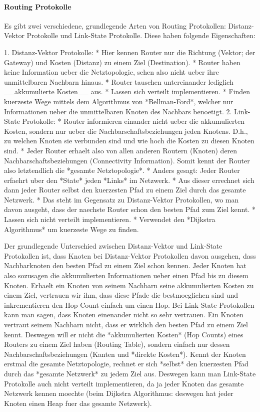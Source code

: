 \paragraph{Routing Protokolle} 

Es gibt zwei verschiedene, grundlegende Arten von Routing Protokollen:
Distanz-Vektor Protokolle und Link-State Protokolle. Diese haben folgende
Eigenschaften:

1. Distanz-Vektor Protokolle:
   * Hier kennen Router nur die Richtung (Vektor; der Gateway) und Kosten (Distanz)
     zu einem Ziel (Destination).
   * Router haben keine Information ueber die Netztopologie, sehen also nicht
     ueber ihre unmittelbaren Nachbarn hinaus.
   * Router tauschen untereinander lediglich \_\_akkumulierte Kosten\_\_ aus.
   * Lassen sich verteilt implementieren.
   * Finden kuerzeste Wege mittels dem Algorithmus von *Bellman-Ford*, welcher
     nur Informationen ueber die unmittelbaren Knoten des Nachbars benoetigt.
2. Link-State Protokolle:
   * Router informieren einander nicht ueber die akkumulierten Kosten, sondern
     nur ueber die Nachbarschaftsbeziehungen jeden Knotens. D.h., zu welchen
     Knoten sie verbunden sind und wie hoch die Kosten zu diesen Knoten sind.
   * Jeder Router erhaelt also von allen anderen Routern (Knoten) deren
     Nachbarschaftsbeziehungen (Connectivity Information). Somit kennt der
     Router also letztendlich die *gesamte Netztopologie*.
   * Anders gesagt: Jeder Router erfaehrt uber den *State* jeden *Links* im
     Netzwerk.
   * Aus dieser errechnet sich dann jeder Router selbst den kuerzesten Pfad
     zu einem Ziel durch das gesamte Netzwerk.
   * Das steht im Gegensatz zu Distanz-Vektor Protokollen, wo man davon ausgeht,
     dass der naechste Router schon den besten Pfad zum Ziel kennt.
   * Lassen sich nicht verteilt implementieren.
   * Verwendet den *Dijkstra Algorithmus* um kuerzeste Wege zu finden.

Der grundlegende Unterschied zwischen Distanz-Vektor und Link-State Protokollen
ist, dass Knoten bei Distanz-Vektor Protokollen davon ausgehen, dass
Nachbarknoten den besten Pfad zu einem Ziel schon kennen. Jeder Knoten hat also
sozusagen die akkumulierten Informationen ueber einen Pfad bis zu diesem
Knoten. Erhaelt ein Knoten von seinem Nachbarn seine akkumulierten Kosten zu
einem Ziel, vertrauen wir ihm, dass diese Pfade die bestmoeglichen sind und
inkrementieren den Hop Count einfach um einen Hop. Bei Link-State Protokollen
kann man sagen, dass Knoten einenander nicht so sehr vertrauen. Ein Knoten
vertraut seinem Nachbarn nicht, dass er wirklich den besten Pfad zu einem Ziel
kennt. Deswegen will er nicht die *akkumulierten Kosten* (Hop Counts) eines
Routers zu einem Ziel haben (Routing Table), sondern einfach nur dessen
Nachbarschaftsbeziehungen (Kanten und *direkte Kosten*). Kennt der Knoten
erstmal die gesamte Netztopologie, rechnet er sich *selbst* den kuerzesten Pfad
durch das *gesamte Netzwerk* zu jedem Ziel aus. Deswegen kann man Link-State
Protokolle auch nicht verteilt implementieren, da ja jeder Knoten das gesamte
Netzwerk kennen moechte (beim Dijkstra Algorithmus: deswegen hat jeder Knoten
einen Heap fuer das gesamte Netzwerk).


